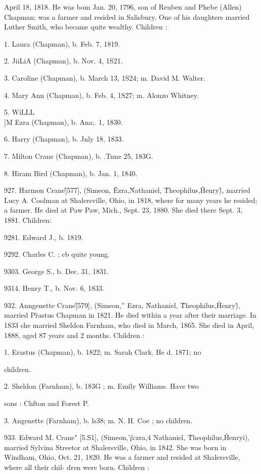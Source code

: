 April 18, 1818. He was bom Jan. 20, 1796, son of Reuben and 
Phebe (Allen) Chapman; was a farmer and resided in Salisbury. 
One of his daughters married Luther Smith, who became quite 
wealthy. Children : 

1. Laura (Chapman), b. Feb. 7, 1819. 

2. JiiLiA (Chapman), b. Nov. 4, 1S21. 

3. Caroline (Chapman), b. March 13, 1S24; m. David M. Walter. 

4. Mary Ann (Chapman), b. Feb. 4, 1S27; m. Alonzo Whitney. 

5. WiLLL\\]M Ezra (Chapman), b. Ana;. 1, 1830. 

6. Harry (Chapman), b. Jnly 18, 1833. 

7. Milton Crane (Chapman), b. .Tnne 25, 183G. 

8. Hiram Bird (Chapman), b. Jan. 1, 1840. 

927. Harmon Crane\^ [577], (Simeon, \^ Ezra,\^ Nathaniel, \^ 
Theophilus,\^ Henry\^), married Lucy A. Coolman at Shalersville, 
Ohio, in 1818, where for many years he resided; a farmer. He 
died at Paw Paw, Mich., Sept. 23, 1880. She died there Sept. 
3, 1881. Children: 

9281. Edward J., b. 1819. 

9292. Charles C. ; cb quite young. 

9303. George S., b. Dec. 31, 1831. 

9314. Henry T., b. Nov. 6, 1833. 

932. Anngenette Crane\^ [579], (Simeon,'' Ezra, \^ Nathaniel, \^ 
Theophilus,\^ Henry\^), married P\^rastus Chapman in 1821. He 
died within a year after their marriage. In 1833 she married 
Sheldon Farnham, who died in March, 1865. She died in April, 
1888, aged 87 years and 2 months. Children : 

1. Erastus (Chapman), b. 1822; m. Sarah Clark. He d. 1871; no 

children. 

2. Sheldon (Farnham), b. 183G ; m. Emily Williams. Have two 

sons : Chfton and Forest P. 

3. Angenette (Farnham), b. ls38; m. N. H. Coe ; no children. 

933. Edward M. Crane" [5.S1], (Simeon,'\^ p:zra,4 Nathaniel, \^ 
Theophilus,\^ Henryi), married Sylvina Streetor at Shalersville, 
Ohio, in 1842. She was born in Windham, Ohio, Oct. 21, 1820. 
He was a farmer and resided at Shalersville, where all their chil- 
dren were born. Children : 



